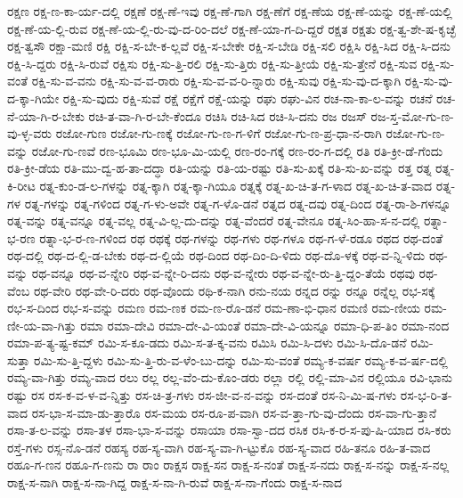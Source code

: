 {ರಕ್ಷಣ
ರಕ್ಷ-ಣ-ಕಾ-ರ್ಯ-ದಲ್ಲಿ
ರಕ್ಷಣೆ
ರಕ್ಷ-ಣೆ-ಇವು
ರಕ್ಷ-ಣೆ-ಗಾಗಿ
ರಕ್ಷ-ಣೆಗೆ
ರಕ್ಷ-ಣೆಯ
ರಕ್ಷ-ಣೆ-ಯನ್ನು
ರಕ್ಷ-ಣೆ-ಯಲ್ಲಿ
ರಕ್ಷ-ಣೆ-ಯ-ಲ್ಲಿ-ರುವ
ರಕ್ಷ-ಣೆ-ಯ-ಲ್ಲಿ-ರು-ವು-ದ-ರಿಂ-ದಲೆ
ರಕ್ಷ-ಣೆ-ಯಾ-ಗ-ದಿ-ದ್ದರೆ
ರಕ್ಷತ
ರಕ್ಷತು
ರಕ್ಷ-ತ್ವ-ಶೇ-ಷ-ಕೃಚ್ಛೆ
ರಕ್ಷ-ತ್ವಸೌ
ರಕ್ಷಾ-ಮಣಿ
ರಕ್ಷಿ
ರಕ್ಷಿ-ಸ-ಬೇ-ಕ-ಲ್ಲವೆ
ರಕ್ಷಿ-ಸ-ಬೇಕೇ
ರಕ್ಷಿ-ಸ-ಬೇಡಿ
ರಕ್ಷಿ-ಸಲಿ
ರಕ್ಷಿಸಿ
ರಕ್ಷಿ-ಸಿದ
ರಕ್ಷಿ-ಸಿ-ದನು
ರಕ್ಷಿ-ಸಿ-ದ್ದರು
ರಕ್ಷಿ-ಸಿ-ರುವೆ
ರಕ್ಷಿಸು
ರಕ್ಷಿ-ಸು-ತ್ತಿ-ರಲಿ
ರಕ್ಷಿ-ಸು-ತ್ತಿರು
ರಕ್ಷಿ-ಸು-ತ್ತೀಯೆ
ರಕ್ಷಿ-ಸು-ತ್ತೇನೆ
ರಕ್ಷಿ-ಸುವ
ರಕ್ಷಿ-ಸು-ವಂತೆ
ರಕ್ಷಿ-ಸು-ವ-ವನು
ರಕ್ಷಿ-ಸು-ವ-ವ-ರಾರು
ರಕ್ಷಿ-ಸು-ವ-ವ-ರಿ-ನ್ನಾರು
ರಕ್ಷಿ-ಸುವು
ರಕ್ಷಿ-ಸು-ವು-ದ-ಕ್ಕಾಗಿ
ರಕ್ಷಿ-ಸು-ವು-ದ-ಕ್ಕಾ-ಗಿಯೇ
ರಕ್ಷಿ-ಸು-ವುದು
ರಕ್ಷಿ-ಸುವೆ
ರಕ್ಷೆ
ರಕ್ಷೆಗೆ
ರಕ್ಷೆ-ಯನ್ನು
ರಘು
ರಘು-ವಿನ
ರಚ-ನಾ-ಕಾ-ಲ-ವನ್ನು
ರಚನೆ
ರಚ-ನೆ-ಯಾ-ಗಿ-ರ-ಬೇಕು
ರಚಿ-ತ-ವಾ-ಗಿ-ರ-ಬೇ-ಕೆಂದೂ
ರಚಿಸಿ
ರಚಿ-ಸಿದ
ರಚಿ-ಸಿ-ದನು
ರಜ
ರಜಸ್
ರಜ-ಸ್ತ-ಮೋ-ಗು-ಣ-ವು-ಳ್ಳ-ವರು
ರಜೋ-ಗುಣ
ರಜೋ-ಗು-ಣಕ್ಕೆ
ರಜೋ-ಗು-ಣ-ಗ-ಳಿಗೆ
ರಜೋ-ಗು-ಣ-ಪ್ರ-ಧಾ-ನ-ರಾಗಿ
ರಜೋ-ಗು-ಣ-ವನ್ನು
ರಜೋ-ಗು-ಣವೆ
ರಣ-ಭೂಮಿ
ರಣ-ಭೂ-ಮಿ-ಯಲ್ಲಿ
ರಣ-ರಂ-ಗಕ್ಕೆ
ರಣ-ರಂ-ಗ-ದಲ್ಲಿ
ರತಿ
ರತಿ-ಕ್ರೀ-ಡೆ-ಗೆಂದು
ರತಿ-ಕ್ರೀ-ಡೆಯ
ರತಿ-ಮು-ದ್ವ-ಹ-ತಾ-ದದ್ಧಾ
ರತಿ-ಯನ್ನು
ರತಿ-ಯ-ರಷ್ಟು
ರತಿ-ಸು-ಖಕ್ಕೆ
ರತಿ-ಸು-ಖ-ವನ್ನು
ರತ್ತ
ರತ್ನ
ರತ್ನ-ಕಿ-ರೀಟ
ರತ್ನ-ಕುಂ-ಡ-ಲ-ಗಳನ್ನು
ರತ್ನ-ಕ್ಕಾಗಿ
ರತ್ನ-ಕ್ಕಾ-ಗಿಯೂ
ರತ್ನಕ್ಕೆ
ರತ್ನ-ಖ-ಚಿ-ತ-ಗ-ಳಾದ
ರತ್ನ-ಖ-ಚಿ-ತ-ವಾದ
ರತ್ನ-ಗಳ
ರತ್ನ-ಗಳನ್ನು
ರತ್ನ-ಗಳಿಂದ
ರತ್ನ-ಗ-ಳು-ಅವೇ
ರತ್ನ-ಗ-ಳೊ-ಡನೆ
ರತ್ನದ
ರತ್ನ-ದವು
ರತ್ನ-ದಿಂದ
ರತ್ನ-ರಾ-ಶಿ-ಗಳನ್ನೂ
ರತ್ನ-ವನ್ನು
ರತ್ನ-ವನ್ನೂ
ರತ್ನ-ವಲ್ಲ
ರತ್ನ-ವಿ-ಲ್ಲ-ದು-ದನ್ನು
ರತ್ನ-ವೆಂದರೆ
ರತ್ನ-ವೇನೂ
ರತ್ನ-ಸಿಂ-ಹಾ-ಸ-ನ-ದಲ್ಲಿ
ರತ್ನಾ-ಭ-ರಣ
ರತ್ನಾ-ಭ-ರ-ಣ-ಗಳಿಂದ
ರಥ
ರಥಕ್ಕೆ
ರಥ-ಗಳನ್ನು
ರಥ-ಗಳು
ರಥ-ಗಳೂ
ರಥ-ಗ-ಳೆ-ರಡೂ
ರಥದ
ರಥ-ದಂತೆ
ರಥ-ದಲ್ಲಿ
ರಥ-ದ-ಲ್ಲಿ-ಡ-ಬೇಕು
ರಥ-ದ-ಲ್ಲಿಯೆ
ರಥ-ದಿಂದ
ರಥ-ದಿಂ-ದಿ-ಳಿದು
ರಥ-ದೊ-ಳಕ್ಕೆ
ರಥ-ವ-ನ್ನಿ-ಳಿದು
ರಥ-ವನ್ನು
ರಥ-ವನ್ನೂ
ರಥ-ವ-ನ್ನೇರಿ
ರಥ-ವ-ನ್ನೇ-ರಿ-ದನು
ರಥ-ವ-ನ್ನೇರು
ರಥ-ವ-ನ್ನೇ-ರು-ತ್ತಿ-ದ್ದಂ-ತೆಯೆ
ರಥವು
ರಥ-ವೆಂಬ
ರಥ-ವೇರಿ
ರಥ-ವೇ-ರಿ-ದರು
ರಥ-ವೊಂದು
ರಥಿ-ಕ-ನಾಗಿ
ರನು-ನಯ
ರನ್ನದ
ರನ್ನು
ರನ್ನೂ
ರನ್ನೆಲ್ಲ
ರಭ-ಸಕ್ಕೆ
ರಭ-ಸ-ದಿಂದ
ರಭ-ಸ-ವನ್ನು
ರಮಣ
ರಮ-ಣಕ
ರಮ-ಣ-ರೊ-ಡನೆ
ರಮ-ಣಾ-ಭಿ-ಧಾನ
ರಮಣಿ
ರಮ-ಣೀಯ
ರಮ-ಣೀ-ಯ-ವಾ-ಗಿತ್ತು
ರಮಾ
ರಮಾ-ದೇವಿ
ರಮಾ-ದೇ-ವಿ-ಯಂತೆ
ರಮಾ-ದೇ-ವಿ-ಯನ್ನೂ
ರಮಾ-ಧಿ-ಪ-ತಿಂ
ರಮಾ-ನಂದ
ರಮಾ-ಪ-ತ್ಯ-ಷ್ಟ-ಕಮ್
ರಮಿ-ಸ-ಕೂ-ಡದು
ರಮಿ-ಸ-ತ-ಕ್ಕ-ವನು
ರಮಿಸಿ
ರಮಿ-ಸಿ-ದಳು
ರಮಿ-ಸಿ-ದೊ-ಡನೆ
ರಮಿ-ಸುತ್ತಾ
ರಮಿ-ಸು-ತ್ತಿ-ದ್ದಳು
ರಮಿ-ಸು-ತ್ತಿ-ರು-ವ-ಳೆಂ-ಬು-ದನ್ನು
ರಮಿ-ಸು-ವಂತೆ
ರಮ್ಯ-ಕ-ವರ್ಷ
ರಮ್ಯ-ಕ-ವ-ರ್ಷ-ದಲ್ಲಿ
ರಮ್ಯ-ವಾ-ಗಿತ್ತು
ರಮ್ಯ-ವಾದ
ರಲು
ರಲ್ಲ
ರಲ್ಲ-ವೆಂ-ದು-ಕೊಂ-ಡರು
ರಲ್ಲಾ
ರಲ್ಲಿ
ರಲ್ಲಿ-ಮಾ-ವಿನ
ರಲ್ಲಿಯೂ
ರವಿ-ಭಾನು
ರಷ್ಟು
ರಸ
ರಸ-ಕ-ವ-ಳ-ವ-ನ್ನಿತ್ತು
ರಸ-ಚಿ-ತ್ರ-ಗಳು
ರಸ-ಜೀ-ವ-ನ-ವನ್ನು
ರಸ-ದಂತೆ
ರಸ-ನಿ-ಮಿ-ಷ-ಗಳು
ರಸ-ಭ-ರಿ-ತ-ವಾದ
ರಸ-ಭಾ-ಸ-ಮಾ-ಡು-ತ್ತಾರೊ
ರಸ-ಮಯ
ರಸ-ರೂ-ಪ-ವಾಗಿ
ರಸ-ವ-ತ್ತಾ-ಗು-ವು-ದೆಂದು
ರಸ-ವಾ-ಗು-ತ್ತಾನೆ
ರಸಾ-ತ-ಲ-ವನ್ನು
ರಸಾ-ತಳ
ರಸಾ-ಭಾ-ಸ-ವನ್ನು
ರಸಾಯಾ
ರಸಾ-ಸ್ವಾ-ದದ
ರಸಿಕ
ರಸಿ-ಕ-ರ-ಸ-ಪು-ಷಿ-ಯಾದ
ರಸಿ-ಕರು
ರಸ್ತೆ-ಗಳು
ರಸ್ಸ-ನೊ-ಡನೆ
ರಹಸ್ಯ
ರಹ-ಸ್ಯ-ವಾಗಿ
ರಹ-ಸ್ಯ-ವಾ-ಗಿ-ಟ್ಟುಕೊ
ರಹ-ಸ್ಯ-ವಾದ
ರಹಿ-ತನೂ
ರಹಿ-ತ-ವಾದ
ರಹೂ-ಗ-ಣನ
ರಹೂ-ಗ-ಣನು
ರಾ
ರಾಂ
ರಾಕ್ಷಸ
ರಾಕ್ಷ-ಸನ
ರಾಕ್ಷ-ಸ-ನಂತೆ
ರಾಕ್ಷ-ಸ-ನದು
ರಾಕ್ಷ-ಸ-ನನ್ನು
ರಾಕ್ಷ-ಸ-ನಲ್ಲ
ರಾಕ್ಷ-ಸ-ನಾಗಿ
ರಾಕ್ಷ-ಸ-ನಾ-ಗಿದ್ದ
ರಾಕ್ಷ-ಸ-ನಾ-ಗಿ-ರುವೆ
ರಾಕ್ಷ-ಸ-ನಾ-ಗೆಂದು
ರಾಕ್ಷ-ಸ-ನಾದ
}
